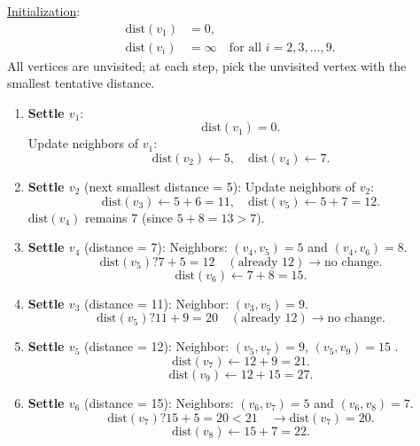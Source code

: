 \documentclass[a4paper,12pt]{article}
\begin{document}
\begin{enumerate}
    
    \underline{Initialization}:
    \[
    \begin{aligned}
    \text{dist}(v_1) &= 0, \\
    \text{dist}(v_i) &= \infty \quad \text{for all } i = 2,3,\dots,9.
    \end{aligned}
    \]
    All vertices are unvisited; at each step, pick the unvisited vertex with the smallest tentative distance.

    \begin{enumerate}
        \item \textbf{Settle \(v_1\)}:
        \[
        \text{dist}(v_1) = 0.
        \]
        Update neighbors of \(v_1\):
        \[
        \text{dist}(v_2) \leftarrow 5, \quad \text{dist}(v_4) \leftarrow 7.
        \]
        
        \item \textbf{Settle \(v_2\)} (next smallest distance = 5):
        Update neighbors of \(v_2\):
        \[
        \text{dist}(v_3) \leftarrow 5 + 6 = 11, \quad
        \text{dist}(v_5) \leftarrow 5 + 7 = 12.
        \]
        \(\text{dist}(v_4)\) remains \(7\) (since \(5 + 8 = 13 > 7\)).
        
        \item \textbf{Settle \(v_4\)} (distance = 7):
        Neighbors: \((v_4, v_5) = 5\) and \((v_4, v_6) = 8\).
        \[
        \text{dist}(v_5) ? 7 + 5 = 12 \quad (\text{already } 12)\rightarrow \text{no change}.
        \]
        \[
        \text{dist}(v_6) \leftarrow 7 + 8 = 15.
        \]
        
        \item \textbf{Settle \(v_3\)} (distance = 11):
        Neighbor: \((v_3, v_5) = 9\).
        \[
        \text{dist}(v_5) ? 11 + 9 = 20 \quad (\text{already } 12)\rightarrow \text{no change}.
        \]
        
        \item \textbf{Settle \(v_5\)} (distance = 12):
        Neighbor: \((v_5, v_7) = 9\), \((v_5, v_9) = 15\) .
        \[
        \text{dist}(v_7) \leftarrow 12 + 9 = 21.
        \]
        \[
        \text{dist}(v_9) \leftarrow 12 + 15 = 27.
        \]

        
        \item \textbf{Settle \(v_6\)} (distance = 15):
        Neighbors: \((v_6, v_7) = 5\) and \((v_6, v_8) = 7\).
        \[
        \text{dist}(v_7) ? 15 + 5 = 20 < 21 \quad \rightarrow \text{dist}(v_7) = 20.
        \]
        \[
        \text{dist}(v_8) \leftarrow 15 + 7 = 22.
        \]
        

\end{enumerate}
\end{enumerate}
\end{document}

